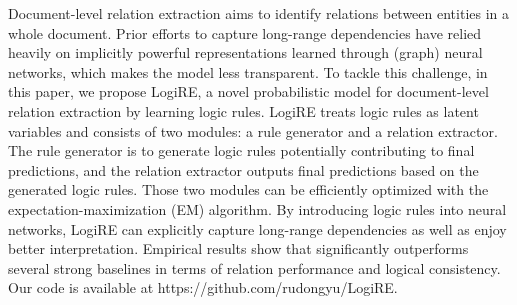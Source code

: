 Document-level relation extraction aims to identify relations between entities in a whole document. Prior efforts to capture long-range dependencies have relied heavily on implicitly powerful representations learned through (graph) neural networks, which makes the model less transparent. To tackle this challenge, in this paper, we propose LogiRE, a novel probabilistic model for document-level relation extraction by learning logic rules. LogiRE treats logic rules as latent variables and consists of two modules: a rule generator and a relation extractor. The rule generator is to generate logic rules potentially contributing to final predictions, and the relation extractor outputs final predictions based on the generated logic rules. Those two modules can be efficiently optimized with the expectation-maximization (EM) algorithm. By introducing logic rules into neural networks, LogiRE can explicitly capture long-range dependencies as well as enjoy better interpretation. Empirical results show that \mymodel significantly outperforms several strong baselines in terms of relation performance and logical consistency. Our code is available at https://github.com/rudongyu/LogiRE.
